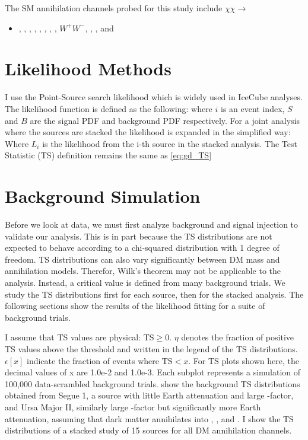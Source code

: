 The SM annihilation channels probed for this study include $\chi\chi \rightarrow$
\begin{itemize}
    \item[] , , , , , \parpar{\mu}, \parpar{\tau}, , $W^+W^-$, , \parpar{\nu_\mu}, and \parpar{\nu_\tau}
\end{itemize}

\section{Likelihood Methods}\label{sec:icDM_LLH}

I use the Point-Source search likelihood which is widely used in IceCube analyses.
The likelihood function is defined as the following:
\icPtSrcLLH
where  $ i $ is an event index, $S$ and $B$ are the signal PDF and background PDF respectively. For a joint analysis where the sources are stacked the likelihood is expanded in the simplified way:
\icStackLLH
Where $ L_i $ is the likelihood from the i-th source in the stacked analysis.
The Test Statistic (TS) definition remains the same as \cref{eq:gd_TS}

\section{Background Simulation}\label{sec:icDM_bkgd_sim}

Before we look at data, we must first analyze background and signal injection to validate our analysis.
This is in part because the TS distributions are not expected to behave according to a chi-squared distribution with 1 degree of freedom.
TS distributions can also vary significantly between DM mass and annihilation models.
Therefor, Wilk's theorem may not be applicable to the analysis.
Instead, a critical value is defined from many background trials.
We study the TS distributions first for each source, then for the stacked analysis.
The following sections show the results of the likelihood fitting for a suite of background trials.

I assume that TS values are physical: $ \mathrm{TS} \ge 0 $.
$\eta$ denotes the fraction of positive TS values above the threshold and written in the legend of the TS distributions.
$ \epsilon[x] $ indicate the fraction of events where $ \mathrm{TS} < x $. For TS plots shown here, the decimal values of x are 1.0e-2 and 1.0e-3.
Each subplot represents a simulation of 100,000 data-scrambled background trials.
 show the background TS distributions obtained from Segue 1, a source with little Earth attenuation and large \J-factor, and Ursa Major II, similarly large \J-factor but significantly more Earth attenuation, assuming that dark matter annihilates into , \parpar{\tau}, and \parpar{\nu_\mu}.
I show the TS distributions of a stacked study of 15 sources for all DM annihilation channels.

